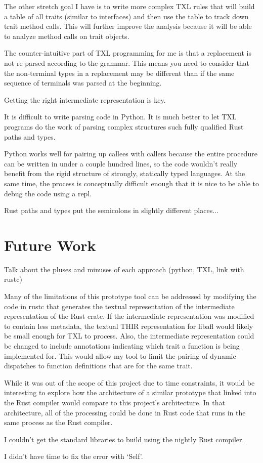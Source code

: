 \documentclass[11pt]{article}
\begin{document}
The other stretch goal I have is to write more complex TXL rules that will build a table of all traits (similar to interfaces) and then use the table to track down trait method calls.
This will further improve the analysis because it will be able to analyze method calls on trait objects.

The counter-intuitive part of TXL programming for me is that a replacement is not re-parsed according to the grammar.
This means you need to consider that the non-terminal types in a replacement may be different than if the same sequence of terminals was parsed at the beginning.

Getting the right intermediate representation is key.

It is difficult to write parsing code in Python.
It is much better to let TXL programs do the work of parsing complex structures such fully qualified Rust paths and types.

Python works well for pairing up callees with callers because the entire procedure can be written in under a couple hundred lines, so the code wouldn't really benefit from the rigid structure of strongly, statically typed languages.
At the same time, the process is conceptually difficult enough that it is nice to be able to debug the code using a repl.

Rust paths and types put the semicolons in slightly different places...

\section{Future Work}

Talk about the pluses and minuses of each approach (python, TXL, link with rustc)

Many of the limitations of this prototype tool can be addressed by modifying the code in rustc that generates the textual representation of the intermediate representation of the Rust crate.
If the intermediate representation was modified to contain less metadata, the textual THIR representation for libafl would likely be small enough for TXL to process.
Also, the intermediate representation could be changed to include annotations indicating which trait a function is being implemented for.
This would allow my tool to limit the pairing of dynamic dispatches to function definitions that are for the same trait.

While it was out of the scope of this project due to time constraints, it would be interesting to explore how the architecture of a similar prototype that linked into the Rust compiler would compare to this project's architecture.
In that architecture, all of the processing could be done in Rust code that runs in the same process as the Rust compiler.

I couldn't get the standard libraries to build using the nightly Rust compiler.

I didn't have time to fix the error with `Self'.
\end{document}
